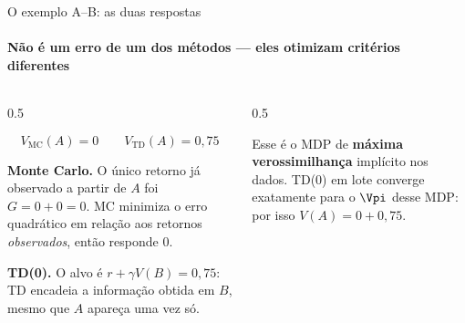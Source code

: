 \documentclass[aspectratio=169, 11pt]{beamer}
\begin{document}
\begin{frame}{O exemplo A--B: as duas respostas}
  \framesubtitle{Não é um erro de um dos métodos — eles otimizam critérios diferentes}

  \begin{columns}[T]
    \begin{column}{0.5\textwidth}
      \begin{respbox}
        \[ V_{\mathrm{MC}}(A) = 0 \qquad V_{\mathrm{TD}}(A) = 0{,}75 \]
      \end{respbox}

      \smallskip
      \textbf{Monte Carlo.} O único retorno já observado a partir de $A$
      foi $G = 0 + 0 = 0$. MC minimiza o erro quadrático em relação aos
      retornos \emph{observados}, então responde $0$.

      \smallskip
      \textbf{TD(0).} O alvo é $r + \gamma V(B) = 0{,}75$: TD encadeia a
      informação obtida em $B$, mesmo que $A$ apareça uma vez só.
    \end{column}
    \begin{column}{0.5\textwidth}
      \begin{center}
      \end{center}

      \vspace{-0.7em}
      \begin{ideiabox}
        Esse é o MDP de \textbf{máxima verossimilhança} implícito nos dados.
        TD(0) em lote converge exatamente para o $\Vpi$ desse MDP: por isso
        $V(A) = 0 + 0{,}75$.
      \end{ideiabox}
    \end{column}
  \end{columns}
\end{frame}
\end{document}
